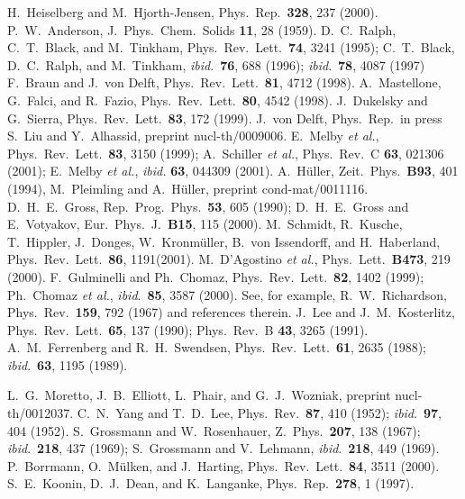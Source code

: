 \begin{multicols}{2}
\begin{references}
 H.~Heiselberg and M.~Hjorth-Jensen, Phys.~Rep.~{\bf 328},
237 (2000).
 P.~W.~Anderson, J.~Phys.~Chem.~Solids {\bf 11}, 28 (1959).
 D.~C.~Ralph, C.~T.~Black, and M.~Tinkham, 
                      Phys.~Rev.~Lett.~{\bf 74}, 3241 (1995); C.~T.~Black, D.~C.~Ralph, 
                      and M.~Tinkham, {\em ibid}.~{\bf 76}, 688 (1996); 
                      {\em ibid}.~{\bf 78}, 4087 (1997) 
 F.~Braun and J.~von Delft, Phys.~Rev.~Lett.~{\bf 81}, 4712 (1998).
 A.~Mastellone, G.~Falci, and R.~Fazio, 
                       Phys.~Rev.~Lett.~{\bf 80}, 4542 (1998).
 J.~Dukelsky and G.~Sierra, Phys.~Rev.~Lett.~{\bf 83}, 172 (1999).
 J.~von Delft, Phys.~Rep.~in press
 S.~Liu and Y.~Alhassid, preprint nucl-th/0009006. 
E.~Melby {\em et al.},
                     Phys.~Rev.~Lett.~{\bf 83}, 3150 (1999); A.~Schiller {\em et al.}, 
                     Phys.\ Rev.~C {\bf 63}, 021306 (2001); 
                     E.~Melby {\em et al.}, {\em ibid.} {\bf 63}, 
                     044309 (2001).
 A.~H\"{u}ller, Zeit.~Phys.~{\bf B93}, 401 (1994), M.~Pleimling and
A.~H\"uller, preprint cond-mat/0011116.
 D.~H.~E.~Gross, Rep.~Prog.~Phys.~{\bf 53}, 605
    (1990);   D.~H.~E.~Gross and E.~Votyakov, Eur.~Phys.~J.~{\bf B15}, 115 (2000).
 M.~Schmidt, R.~Kusche, T.~Hippler, J.~Donges, W.~Kronm\"uller, 
                    B.~von Issendorff, and H.~Haberland,   
                    Phys.~Rev.~Lett.~{\bf 86}, 1191(2001).
M.~D'Agostino {\em et al.}, Phys.~Lett.~{\bf B473}, 219 (2000).
 F.~Gulminelli and Ph.~Chomaz, Phys.~Rev.~Lett.~{\bf 82}, 1402 (1999); 
               Ph.~Chomaz {\em et al.}, {\em ibid}.~{\bf 85}, 3587 (2000). 
 See, for example, R.~W.~Richardson, Phys.~Rev.~{\bf 159},
                     792 (1967) and references therein.
 J.~Lee and J.~M.~Kosterlitz, Phys.~Rev.~Lett.~{\bf 65}, 137 (1990);
                Phys.~Rev.~B {\bf 43}, 3265 (1991).
 A.~M.~Ferrenberg and R.~H.~Swendsen, Phys.~Rev.~Lett.~{\bf 61}, 2635 (1988); {\em ibid}.~{\bf 63}, 1195 (1989).

 L.~G.~Moretto, J.~B.~Elliott, L.~Phair, and G.~J.~Wozniak,
                    preprint nucl-th/0012037.
 C.~N.~Yang and T.~D.~Lee, Phys.~Rev.~{\bf 87}, 410 (1952);
{\em ibid}.~{\bf 97}, 404 (1952).
 S.~Grossmann and W.~Rosenhauer, Z.~Phys.~{\bf 207}, 
138 (1967); {\em ibid}.~{\bf 218}, 437 (1969); S.~Grossmann and V.~Lehmann,
{\em ibid}.~{\bf 218}, 449 (1969).
 P.~Borrmann, O.~M\"ulken, and J.~Harting, 
Phys.~Rev.~Lett.~{\bf 84}, 3511 (2000).  
 S.~E.~Koonin, D.~J.~Dean,  and K.~Langanke, 
                  Phys.~Rep.~{\bf 278}, 1 (1997). 
\end{references}

\end{multicols}

